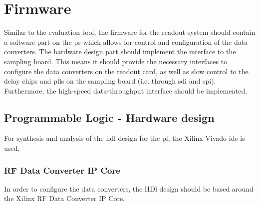 \section{Firmware}\label{sec:firmware}
Similar to the evaluation tool, the firmware for the readout system should contain a software part on the \gls{ps} which allows for control and configuration of the data converters. 
The hardware design part should implement the interface to the sampling board. 
This means it should provide the necessary interfaces to configure the data converters on the readout card, as well as slow control to the delay chips and \glspl{pll} on the sampling board (i.e. through \gls{sdi} and \gls{spi}). 
Furthermore, the high-speed data-throughput interface should be implemented.
\subsection{Programmable Logic - Hardware design}
For synthesis and analysis of the \gls{hdl} design for the \gls{pl}, the Xilinx Vivado \gls{ide} is used.
\subsubsection*{RF Data Converter IP Core}
In order to configure the data converters, the HDl design should be based around the Xilinx RF Data Converter IP Core. 

